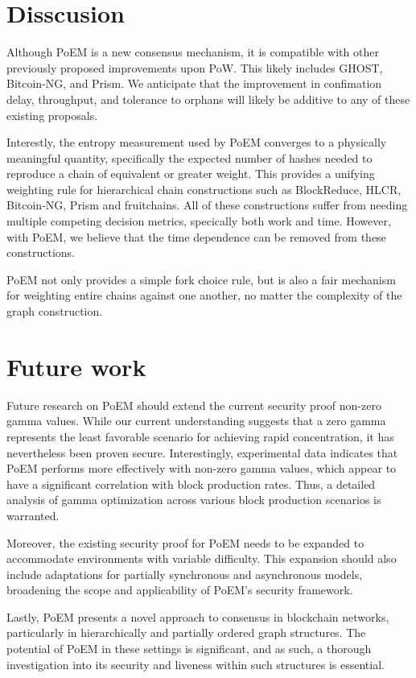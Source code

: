 \section{Disscusion}
Although PoEM is a new consensus mechanism, it is compatible with other
previously proposed improvements upon PoW. This likely includes GHOST,
Bitcoin-NG, and Prism. We anticipate that the improvement in confimation delay,
throughput, and tolerance to orphans will likely be additive to any of these
existing proposals. 

Interestly, the entropy measurement used by PoEM converges to a physically
meaningful quantity, specifically the expected number of hashes needed to
reproduce a chain of equivalent or greater weight.  This provides a unifying
weighting rule for hierarchical chain constructions such as BlockReduce, HLCR,
Bitcoin-NG, Prism and fruitchains. All of these constructions suffer from
needing multiple competing decision metrics, specically both work and time.
However, with PoEM, we believe that the time dependence can be removed from
these constructions. 

PoEM not only provides a simple fork choice rule, but is also a fair mechanism
for weighting entire chains against one another, no matter the complexity of
the graph construction. 

\section{Future work} Future research on PoEM should extend the current
security proof non-zero gamma values. While our current understanding suggests
that a zero gamma represents the least favorable scenario for achieving rapid
concentration, it has nevertheless been proven secure. Interestingly,
experimental data indicates that PoEM performs more effectively with non-zero
gamma values, which appear to have a significant correlation with block
production rates. Thus, a detailed analysis of gamma optimization across
various block production scenarios is warranted.

Moreover, the existing security proof for PoEM needs to be expanded to
accommodate environments with variable difficulty. This expansion should also
include adaptations for partially synchronous and asynchronous models,
broadening the scope and applicability of PoEM's security framework.

Lastly, PoEM presents a novel approach to consensus in blockchain networks,
particularly in hierarchically and partially ordered graph structures. The
potential of PoEM in these settings is significant, and as such, a thorough
investigation into its security and liveness within such structures is
essential. 
